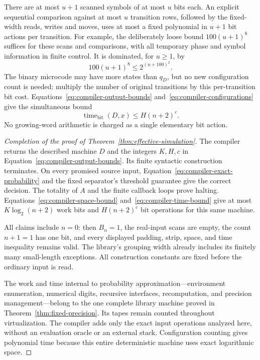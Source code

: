 There are at most $u+1$ scanned symbols of at most $u$ bits each.
An explicit sequential comparison against at most $u$ transition rows,
followed by the fixed-width reads, writes and moves, uses at most a
fixed polynomial in $u+1$ bit actions per transition.  For example,
the deliberately loose bound $100(u+1)^8$ suffices for these scans
and comparisons, with all temporary phase and symbol information in
finite control.  It is dominated, for $u\ge1$, by
\[
 100(u+1)^8\le2^{(u+100)^2}.
\]
The binary microcode may have more states than $q_D$, but no new
configuration count is needed: multiply the number of original
transitions by this per-transition bit cost.  Equations~\eqref{eq:compiler-output-bounds}
and~\eqref{eq:compiler-configurations} give the simultaneous bound
\begin{equation}\label{eq:compiler-time-bound}
 \operatorname{time}_{\mathrm{bit}}(D,x)
 \le H(n+2)^c.
\end{equation}
No growing-word arithmetic is charged as a single elementary bit action.

\begin{proof}[Completion of the proof of Theorem~\ref{thm:effective-simulation}]
The compiler returns the described machine $D$ and the integers
$K,H,c$ in Equation~\eqref{eq:compiler-output-bounds}.  Its finite
syntactic construction terminates.  On every promised source input,
Equation~\eqref{eq:compiler-exact-probability} and the fixed separator's
threshold guarantee give the correct decision.  The totality of $A$
and the finite callback loops prove halting.  Equations~\eqref{eq:compiler-space-bound}
and~\eqref{eq:compiler-time-bound} give at most $K\log_2(n+2)$
work bits and $H(n+2)^c$ bit operations for this same machine.

All claims include $n=0$: then $B_n=1$, the real-input scans are empty,
the count $n+1=1$ has one bit, and every displayed padding, strip,
space, and time inequality remains valid.  The library's grouping
width already includes its finitely many small-length exceptions.
All construction constants are fixed before the ordinary input is read.

The work and time internal to probability approximation---environment
enumeration, numerical digits, recursive interfaces, recomputation,
and precision management---belong to the one complete library machine
proved in Theorem~\ref{thm:fixed-precision}.  Its tapes remain counted
throughout virtualization.  The compiler adds only the exact input
operations analyzed here, without an evaluation oracle or an external
stack.  Configuration counting gives polynomial time because this
entire deterministic machine uses exact logarithmic space.
\end{proof}
